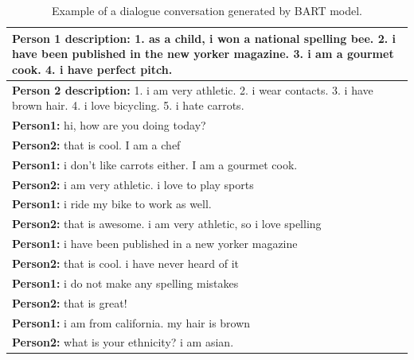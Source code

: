 \begin{table}[ht]
\centering
 \begin{tabular}{|p{14cm}|}
 \hline
 \textbf{Person 1 description:} 1. as a child, i won a national spelling bee. 2. i have been published in the new yorker magazine. 3. i am a gourmet cook. 4. i have perfect pitch. \\
 \hline
 \textbf{Person 2 description:} 1. i am very athletic. 2. i wear contacts. 3. i have brown hair. 4. i love bicycling. 5. i hate carrots. \\
 \hline
 \textbf{Person1:} hi, how are you doing today?  \\
 \textbf{Person2:} that is cool. I am a chef  \\ 
 \textbf{Person1:} i don't like carrots either. I am a gourmet cook. \\
 \textbf{Person2:} i am very athletic. i love to play sports \\
 \textbf{Person1:} i ride my bike to work as well. \\
 \textbf{Person2:} that is awesome. i am very athletic, so i love spelling \\
 \textbf{Person1:} i have been published in a new yorker magazine \\
 \textbf{Person2:} that is cool. i have never heard of it \\
 \textbf{Person1:} i do not make any spelling mistakes\\
 \textbf{Person2:} that is great! \\
 \textbf{Person1:} i am from california. my hair is brown \\
 \textbf{Person2:} what is your ethnicity? i am asian. \\
 \hline
 \end{tabular}
 \caption{Example of a dialogue conversation generated by BART model.}
\label{tab:bart_experiment}
\end{table}


